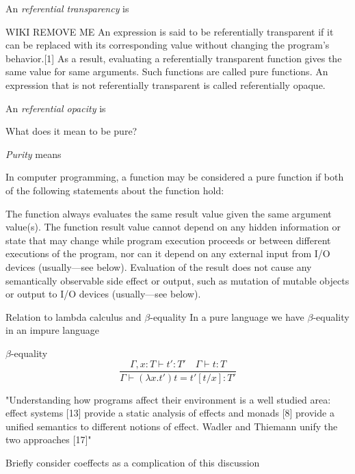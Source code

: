 \begin{definition}
    An \textit{referential transparency} is
\end{definition}
WIKI REMOVE ME
An expression is said to be referentially transparent if it can be replaced with its corresponding value without changing the program's behavior.[1] As a result, evaluating a referentially transparent function gives the same value for same arguments. Such functions are called pure functions. An expression that is not referentially transparent is called referentially opaque.
\begin{definition}
    An \textit{referential opacity} is
\end{definition}

What does it mean to be pure?
\begin{definition}
    \textit{Purity} means


    In computer programming, a function may be considered a pure function if both of the following statements about the function hold:

The function always evaluates the same result value given the same argument value(s). The function result value cannot depend on any hidden information or state that may change while program execution proceeds or between different executions of the program, nor can it depend on any external input from I/O devices (usually—see below).
Evaluation of the result does not cause any semantically observable side effect or output, such as mutation of mutable objects or output to I/O devices (usually—see below).

\end{definition}

Relation to lambda calculus and $\beta$-equality
In a pure language we have $\beta$-equality
in an impure language 

$\beta$-equality
\begin{equation}
\frac
{\Gamma, x : T \vdash t\prime : T\prime \quad \Gamma \vdash t : T}
{\Gamma \vdash (\lambda x.t\prime)t = t\prime[t/x]: T\prime }
\end{equation}

"Understanding how programs affect their environment is a well studied area: effect systems [13] provide a static analysis of effects and monads [8] provide a unified semantics to different notions of effect. Wadler and Thiemann unify the two approaches [17]"


Briefly consider coeffects as a complication of this discussion

